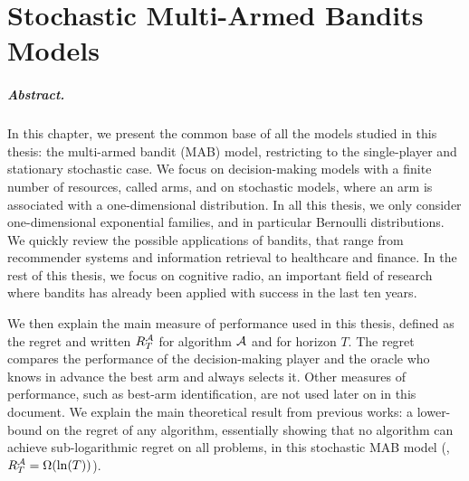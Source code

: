 
\chapter{Stochastic Multi-Armed Bandits Models}
\label{chapter:2}


\minitoc
\graphicspath{{2-Chapters/2-Chapter/Images/}}

\newpage

\paragraph{Abstract.}
%
In this chapter, we present the common base of all the models studied in this thesis:
the multi-armed bandit (MAB) model,
restricting to the single-player and stationary stochastic case.
We focus on decision-making models with a finite number of resources, called arms, and on stochastic models, where an arm is associated with a one-dimensional distribution.
In all this thesis, we only consider one-dimensional exponential families, and in particular Bernoulli distributions.
%
We quickly review the possible applications of bandits, that range from recommender systems and information retrieval to healthcare and finance. In the rest of this thesis, we focus on cognitive radio, an important field of research where bandits has already been applied with success in the last ten years.

We then explain the main measure of performance used in this thesis, defined as the regret and written $R_T^{\mathcal{A}}$ for algorithm $\mathcal{A}$ and for horizon $T$. The regret compares the performance of the decision-making player and the oracle who knows in advance the best arm and always selects it.
Other measures of performance, such as best-arm identification, are not used later on in this document.
%
We explain the main theoretical result from previous works: a lower-bound on the regret of any algorithm, essentially showing that no algorithm can achieve sub-logarithmic regret on all problems, in this stochastic MAB model (\ie, $R_T^{\mathcal{A}} = \Omega(\ln(T))$).

